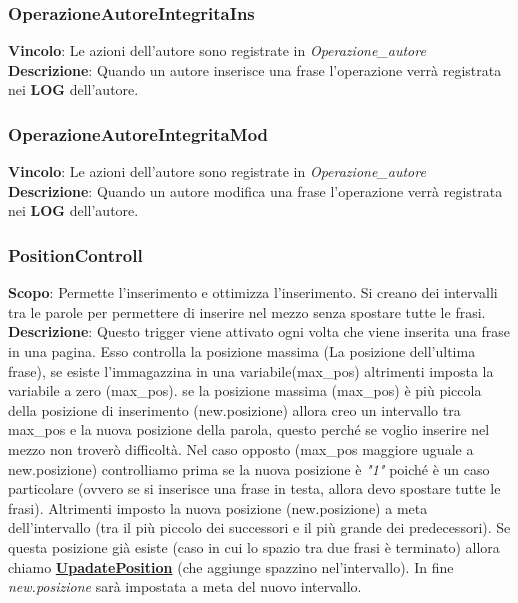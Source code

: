 \hypertarget{OperazioneAutoreIntegritaIns}{}
\subsubsection{OperazioneAutoreIntegritaIns}
\textbf{Vincolo}: Le azioni dell'autore sono registrate in \textit{Operazione\_autore}\newline\newline
\textbf{Descrizione}: Quando un autore inserisce una frase l'operazione verrà registrata nei \textbf{LOG} dell'autore.\newline



\hypertarget{OperazioneAutoreIntegritaMod}{}
\subsubsection{OperazioneAutoreIntegritaMod}
\textbf{Vincolo}: Le azioni dell'autore sono registrate in \textit{Operazione\_autore}\newline\newline
\textbf{Descrizione}: Quando un autore modifica una frase l'operazione verrà registrata nei \textbf{LOG} dell'autore.\newline


\newpage
\subsubsection{PositionControll}
\textbf{Scopo}: Permette l'inserimento e  ottimizza l'inserimento. Si creano dei intervalli tra le parole per permettere di inserire nel mezzo senza spostare tutte le frasi.\newline\newline
\textbf{Descrizione}: Questo trigger viene attivato ogni volta che viene inserita una frase in una pagina. Esso controlla la posizione massima (La posizione dell'ultima frase), se esiste l'immagazzina in una variabile(max\_pos) altrimenti imposta la variabile a zero (max\_pos). se la posizione massima (max\_pos) è più piccola della posizione di inserimento (new.posizione) allora creo un intervallo tra max\_pos e la nuova posizione della parola, questo perché se voglio inserire nel mezzo non troverò difficoltà. Nel caso opposto (max\_pos maggiore uguale a new.posizione) controlliamo prima se la nuova posizione è \textit{"1"} poiché è un caso particolare (ovvero se si inserisce una frase in testa, allora devo spostare tutte le frasi). Altrimenti imposto la nuova posizione (new.posizione) a meta dell'intervallo (tra il più piccolo dei successori e il più grande dei predecessori). Se questa posizione già esiste (caso in cui lo spazio tra due frasi è terminato) allora chiamo \hyperlink{UpadatePosition}{\textbf{UpadatePosition}} (che aggiunge spazzino nel'intervallo). In fine \textit{new.posizione} sarà impostata a meta del nuovo intervallo.\newline


